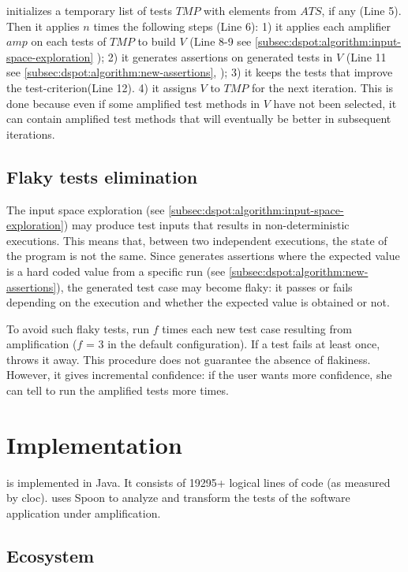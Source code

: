\dspot initializes a temporary list of tests $TMP$ with elements from $ATS$, if any (Line 5).
Then it applies $n$ times the following steps (Line 6):
1) it applies each amplifier $amp$ on each tests of $TMP$ to build $V$ (Line 8-9 see \autoref{subsec:dspot:algorithm:input-space-exploration} \ie \Iampl);
2) it generates assertions on generated tests in $V$ (Line 11 see \autoref{subsec:dspot:algorithm:new-assertions}, \ie \Aampl);
3) it keeps the tests that improve the test-criterion(Line 12).
4) it assigns $V$ to $TMP$ for the next iteration. This is done because even if some amplified test methods in $V$ have not been selected, it can contain amplified test methods that will eventually be better in subsequent iterations.

\subsection{Flaky tests elimination}
\label{subsec:dspot:algorithm:flaky-test-elimination}
The input space exploration (see \autoref{subsec:dspot:algorithm:input-space-exploration}) may produce test inputs that results in non-deterministic executions.
This means that, between two independent executions, the state of the program is not the same.
Since \dspot generates assertions where the expected value is a hard coded value from a specific run (see \autoref{subsec:dspot:algorithm:new-assertions}), the generated test case may become flaky: it passes or fails depending on the execution and whether the expected value is obtained or not.

To avoid such flaky tests, \dspot run $f$ times each new test case resulting from amplification ($f$ = 3 in the default configuration). 
If a test fails at least once, \dspot throws it away. 
This procedure does not guarantee the absence of flakiness.
However, it gives incremental confidence: if the user wants more confidence, she can tell \dspot to run the amplified tests more times.

\section{Implementation}
\label{sec:dspot:implemention}

\dspot is implemented in Java.
It consists of 19295+ logical lines of code (as measured by cloc).
\dspot uses Spoon\cite{pawlak:hal-01169705} to analyze and transform the tests of the software application under amplification.

\subsection{Ecosystem}
\label{subsec:dspot:implemention:ecosystem}

